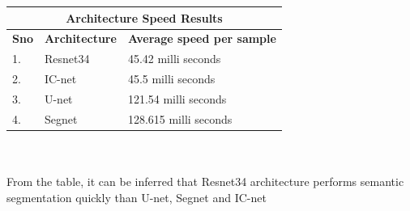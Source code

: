 \documentclass{IEEEtran}
\begin{document}
\begin{tabular}{ |p{0.6cm}|p{1.8cm}|p{4cm}|}
 \hline
 \multicolumn{3}{|c|}{\textbf{Architecture Speed Results}} \\
 \hline
 \textbf{Sno} & \textbf{Architecture} & \textbf{Average speed per sample}\\
 \hline
 1. & Resnet34   & 45.42 milli seconds \\
 \hline
 2. & IC-net   & 45.5 milli seconds  \\
 \hline
 3. & U-net   & 121.54 milli seconds   \\
 \hline
 4. & Segnet   & 128.615 milli seconds  \\
 \hline
\end{tabular}
\\
\\
From the table, it can be inferred that Resnet34 architecture performs semantic segmentation quickly than U-net, Segnet and IC-net
\end{document}
